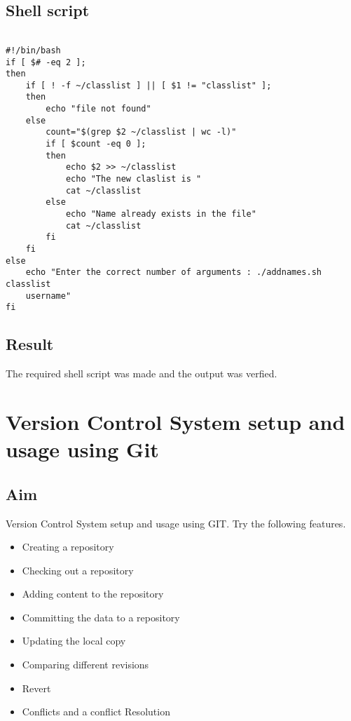 \documentclass{article}
\begin{document}
\subsection{Shell script}
\begin{verbatim}

#!/bin/bash
if [ $# -eq 2 ];
then
    if [ ! -f ~/classlist ] || [ $1 != "classlist" ];
    then 
        echo "file not found"
    else
        count="$(grep $2 ~/classlist | wc -l)"
        if [ $count -eq 0 ];
        then 
            echo $2 >> ~/classlist
            echo "The new claslist is "
            cat ~/classlist
        else
            echo "Name already exists in the file"
            cat ~/classlist
        fi
    fi
else
    echo "Enter the correct number of arguments : ./addnames.sh classlist
    username"
fi

\end{verbatim}

\subsection{Result}
The required shell script was made and the output was verfied.

\newpage

\section{Version Control System setup and usage using Git}

\subsection{Aim}
Version Control System setup and usage using GIT. Try the following features.
\begin{itemize}
\item Creating a repository
\item Checking out a repository
\item Adding content to the repository
\item Committing the data to a repository
\item Updating the local copy
\item Comparing different revisions
\item Revert
\item Conflicts and a conflict Resolution
\end{itemize}
\end{document}
